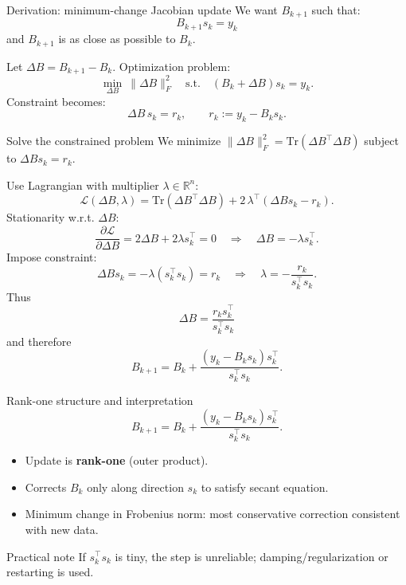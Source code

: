 \documentclass[aspectratio=169]{beamer}
\newcommand{\R}{\mathbb{R}}
\begin{document}
\begin{frame}{Derivation: minimum-change Jacobian update}
We want $B_{k+1}$ such that:
\[
B_{k+1}s_k=y_k
\]
and $B_{k+1}$ is as close as possible to $B_k$.

Let $\Delta B = B_{k+1}-B_k$.
Optimization problem:
\[
\min_{\Delta B}\ \|\Delta B\|_F^2
\quad\text{s.t.}\quad
(B_k+\Delta B)s_k=y_k.
\]
Constraint becomes:
\[
\Delta B\, s_k = r_k,\qquad r_k := y_k - B_k s_k.
\]
\end{frame}

\begin{frame}{Solve the constrained problem}
We minimize $\|\Delta B\|_F^2=\mathrm{Tr}(\Delta B^\top \Delta B)$ subject to $\Delta B s_k=r_k$.

Use Lagrangian with multiplier $\lambda\in\R^n$:
\[
\mathcal{L}(\Delta B,\lambda)=\mathrm{Tr}(\Delta B^\top \Delta B) + 2\,\lambda^\top(\Delta B s_k-r_k).
\]
Stationarity w.r.t. $\Delta B$:
\[
\frac{\partial \mathcal{L}}{\partial \Delta B}=2\Delta B + 2\lambda s_k^\top =0
\quad\Rightarrow\quad
\Delta B = -\lambda s_k^\top.
\]
Impose constraint:
\[
\Delta B s_k = -\lambda (s_k^\top s_k)=r_k
\quad\Rightarrow\quad
\lambda = -\frac{r_k}{s_k^\top s_k}.
\]
Thus
\[
\boxed{
\Delta B = \frac{r_k s_k^\top}{s_k^\top s_k}
}
\]
and therefore
\[
\boxed{
B_{k+1}=B_k+\frac{(y_k-B_k s_k)s_k^\top}{s_k^\top s_k}.
}
\]
\end{frame}

\begin{frame}{Rank-one structure and interpretation}
\[
B_{k+1} = B_k + \frac{(y_k - B_k s_k)s_k^\top}{s_k^\top s_k}.
\]
\begin{itemize}
\item Update is \textbf{rank-one} (outer product).
\item Corrects $B_k$ only along direction $s_k$ to satisfy secant equation.
\item Minimum change in Frobenius norm: most conservative correction consistent with new data.
\end{itemize}

\begin{block}{Practical note}
If $s_k^\top s_k$ is tiny, the step is unreliable; damping/regularization or restarting is used.
\end{block}
\end{frame}
\end{document}
